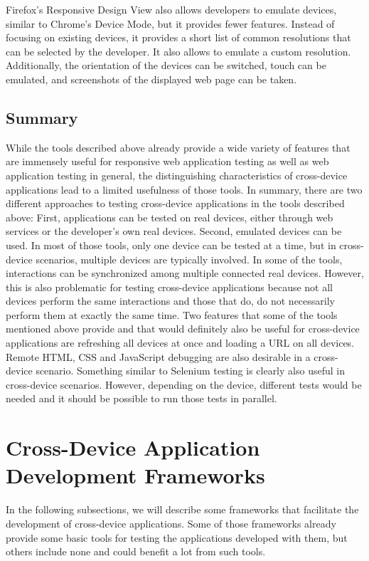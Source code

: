 Firefox's Responsive Design View also allows developers to emulate devices, similar to Chrome's Device Mode, but it provides fewer features. Instead of focusing on existing devices, it provides a short list of common resolutions that can be selected by the developer. It also allows to emulate a custom resolution. Additionally, the orientation of the devices can be switched, touch can be emulated, and screenshots of the displayed web page can be taken.

\subsection{Summary}

While the tools described above already provide a wide variety of features that are immensely useful for responsive web application testing as well as web application testing in general, the distinguishing characteristics of cross-device applications lead to a limited usefulness of those tools. In summary, there are two different approaches to testing cross-device applications in the tools described above: First, applications can be tested on real devices, either through web services or the developer's own real devices. Second, emulated devices can be used. In most of those tools, only one device can be tested at a time, but in cross-device scenarios, multiple devices are typically involved. In some of the tools, interactions can be synchronized among multiple connected real devices. However, this is also problematic for testing cross-device applications because not all devices perform the same interactions and those that do, do not necessarily perform them at exactly the same time. Two features that some of the tools mentioned above provide and that would definitely also be useful for cross-device applications are refreshing all devices at once and loading a URL on all devices. Remote HTML, CSS and JavaScript debugging are also desirable in a cross-device scenario. Something similar to Selenium testing is clearly also useful in cross-device scenarios. However, depending on the device, different tests would be needed and it should be possible to run those tests in parallel.

\section{Cross-Device Application Development Frameworks}

In the following subsections, we will describe some frameworks that facilitate the development of cross-device applications. Some of those frameworks already provide some basic tools for testing the applications developed with them, but others include none and could benefit a lot from such tools.

